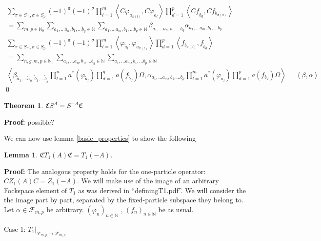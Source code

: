 \documentclass[a4paper,12pt]{article}
\newtheorem{lemma}{Lemma }
\newtheorem{theorem}{Theorem }
\begin{document}
\begin{multline}
\sum_{\pi\in S_m, \sigma \in S_p} (-1)^\pi(-1)^\sigma\prod_{l=1}^m \left<    C \varphi_{a_{\pi(l)}} ,C \varphi_{\tilde{a}_l} \right>  \prod_{d=1}^p \left< C f_{\tilde{b}_d}, C f_{b_{\sigma (d)}}\right> \\
= \sum_{m,p \in \mathbb{N}_0} \sum_{\tilde{a}_1, \dots \tilde{a}_n, \tilde{b}_1 , \dots \tilde{b}_g \in \mathbb{N}}  \sum_{a_1, \dots a_m, b_1 , \dots b_p \in \mathbb{N}}\beta_{a_1,\dots a_n, b_1, \dots b_g} \alpha_{a_1,\dots a_m, b_1, \dots b_p} \\
\sum_{\pi\in S_m, \sigma \in S_p} (-1)^\pi(-1)^\sigma\prod_{l=1}^m \left<     \varphi_{\tilde{a}_l} , \varphi_{a_{\pi(l)}} \right>  \prod_{d=1}^p \left<  f_{b_{\sigma (d)}},  f_{\tilde{b}_d}\right> \\
=\sum_{n,g,m,p \in \mathbb{N}_0} \sum_{\tilde{a}_1, \dots \tilde{a}_n, \tilde{b}_1 , \dots \tilde{b}_g \in \mathbb{N}}  \sum_{a_1, \dots a_m, b_1 , \dots b_p \in \mathbb{N}}\\
\left<  \beta_{\tilde{a}_1,\dots \tilde{a}_n, \tilde{b}_1, \dots \tilde{b}_g} \prod_{l=1}^n a^*(\varphi_{\tilde{a}_l}) \prod_{d=1}^g a(f_{\tilde{b}_d}) \Omega, \alpha_{a_1,\dots a_m, b_1, \dots b_p} \prod_{l=1}^m a^*(\varphi_{a_l}) \prod_{d=1}^p a(f_{b_d}) \Omega\right> =\left< \beta, \alpha \right>
\end{multline}
\qed

\begin{theorem}
\(\mathfrak{C}S^A=S^{-A} \mathfrak{C}\)
\end{theorem}
{\bf Proof:} possible?
\vspace{1.0cm}

We can now use lemma \ref{basic_properties} to show the following 
\begin{lemma} \(\mathfrak{C} T_1(A) \mathfrak{C}= T_1(-A) \). 
\end{lemma}
{\bf Proof:}
The analogous property holds for the one-particle operator: \(C Z_1(A)C= Z_1(-A)\). We will make use of the image of an arbitrary Fockspace element of \( T_1 \) as was derived in ``defining\textunderscore T1.pdf''. We will consider the the image part by part, separated by the fixed-particle subspace they belong to. Let \(\alpha \in \mathcal{F}_{m,p}\) be arbitrary. \((\varphi_n)_{n\in \mathbb{N}}\) , \((f_n)_{n\in \mathbb{N}}\) be as usual.
\begin{center}
{\large Case 1: \(\left. T_1\right|_{\mathcal{F}_{m,p}\rightarrow\mathcal{F}_{m,p}}\)}
\end{center}
\end{document}
